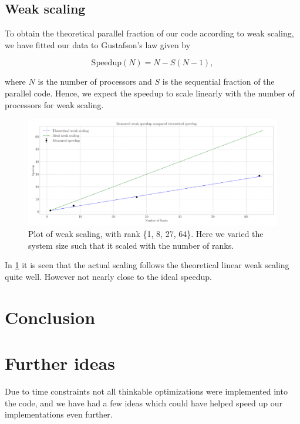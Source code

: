 \documentclass{article}
\begin{document}
\subsection{Weak scaling}

To obtain the theoretical parallel fraction of our code according to weak scaling, we have fitted our data to Gustafson's law given by \autocite{robeyParallelHighPerformance2021}

\begin{equation}
    \text{Speedup}(N) = N - S(N-1),
\end{equation}

where $N$ is the number of processors and $S$ is the sequential fraction of the parallel code. Hence, we expect the speedup to scale linearly with the number of processors for weak scaling.
\begin{figure}[h!]
    \centering
    \includegraphics[width=.95\textwidth]{Final_project/Report/weak_scaling.pdf}
    \caption{Plot of weak scaling, with rank \{1, 8, 27, 64\}. Here we varied the system size such that it scaled with the number of ranks.}
    \label{fig:weak}
\end{figure}

In \cref{fig:weak} it is seen that the actual scaling follows the theoretical linear weak scaling quite well. However not nearly close to the ideal speedup.  


\section{Conclusion}

\section{Further ideas}
Due to time constraints not all thinkable optimizations were implemented into the code, and we have had a few ideas which could have helped speed up our implementations even further. 
\end{document}
